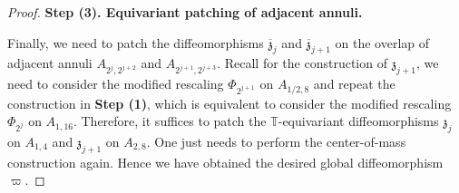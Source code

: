 \documentclass[10pt,a4paper]{amsart}
\begin{document}
\begin{proof}
    \vspace{10pt}
    \noindent\textbf{Step (3). Equivariant patching of adjacent annuli.}
    \vspace{10pt}



    Finally, we need to patch the diffeomorphisms $\overline{\mathfrak{z}}_j$ and $\overline{\mathfrak{z}}_{j+1}$ on the overlap of adjacent annuli $A_{2^j,2^{j+2}}$ and $A_{2^{j+1},2^{j+3}}$. Recall for the construction of $\mathfrak{z}_{j+1}$, we need to consider the modified rescaling $\Phi_{2^{j+1}}$ on $A_{1/2,8}$ and repeat the construction in \textbf{Step (1)}, which is equivalent to consider the modified rescaling $\Phi_{2^j}$ on $A_{1,16}$. Therefore, it suffices to patch the $\mathbb{T}$-equivariant diffeomorphisms $\mathfrak{z}_j$ on $A_{1,4}$ and $\mathfrak{z}_{j+1}$ on $A_{2,8}$. One just needs to perform the center-of-mass construction again. Hence we have obtained the desired global diffeomorphism $\varpi$.
\end{proof}
\end{document}
